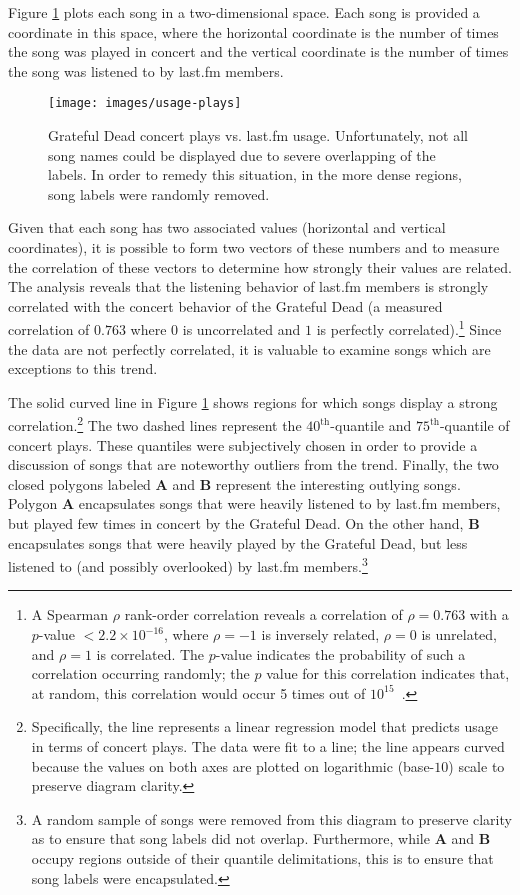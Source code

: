 \documentclass{svmult}
\begin{document}
Figure \ref{fig:usage-plays} plots each song in a two-dimensional space. Each song is provided a coordinate in this space, where the horizontal coordinate is the number of times the song was played in concert and the vertical coordinate is the number of times the song was listened to by last.fm members.
\begin{figure}[ht]
\begin{center}
\texttt{[image: images/usage-plays]}
\caption{\label{fig:usage-plays}Grateful Dead concert plays vs. last.fm usage. Unfortunately, not all song names could be displayed due to severe overlapping of the labels. In order to remedy this situation, in the more dense regions, song labels were randomly removed.}
\end{center}
\end{figure}
Given that each song has two associated values (horizontal and vertical coordinates), it is possible to form two vectors of these numbers and to measure the correlation of these vectors to determine how strongly their values are related. The analysis reveals that the listening behavior of last.fm members is strongly correlated with the concert behavior of the Grateful Dead (a measured correlation of $0.763$ where $0$ is uncorrelated and $1$ is perfectly correlated).\footnote{A Spearman $\rho$ rank-order correlation reveals a correlation of $\rho = 0.763$ with a $p$-value $< 2.2\times 10^{-16}$, where $\rho = -1$ is inversely related, $\rho=0$ is unrelated, and $\rho=1$ is correlated.  The $p$-value indicates the probability of such a correlation occurring randomly; the $p$ value for this correlation indicates that, at random, this correlation would occur 5 times out of $10^{15}$~\cite{parame:sheskin2004}.}  Since the data are not perfectly correlated, it is valuable to examine songs which are exceptions to this trend.

The solid curved line in Figure \ref{fig:usage-plays} shows regions for which songs display a strong correlation.\footnote{Specifically, the line represents a linear regression model that predicts usage in terms of concert plays. The data were fit to a line; the line appears curved because the values on both axes are plotted on logarithmic (base-$10$) scale to preserve diagram clarity.} The two dashed lines represent the $40^{\text{th}}$-quantile and $75^{\text{th}}$-quantile of concert plays. These quantiles were subjectively chosen in order to provide a discussion of songs that are noteworthy outliers from the trend. Finally, the two closed polygons labeled {\bf A} and {\bf B} represent the interesting outlying songs. Polygon {\bf A} encapsulates songs that were heavily listened to by last.fm members, but played few times in concert by the Grateful Dead. On the other hand, {\bf B} encapsulates songs that were heavily played by the Grateful Dead, but less listened to (and possibly overlooked) by last.fm members.\footnote{A random sample of songs were removed from this diagram to preserve clarity as to ensure that song labels did not overlap. Furthermore, while {\bf A} and {\bf B} occupy regions outside of their quantile delimitations, this is to ensure that song labels were encapsulated.}
\end{document}
